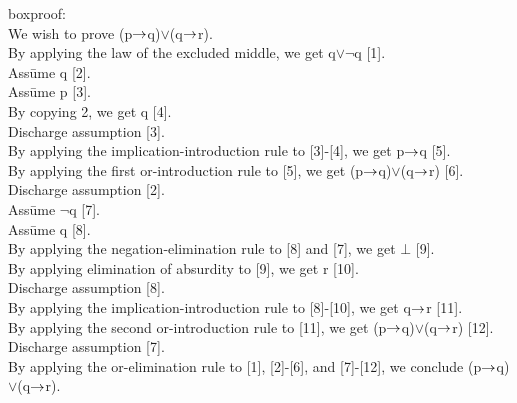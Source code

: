 \begin{tabbing}
boxproof:\\
We wish to prove (p\(\rightarrow\)q)\(\lor\)(q\(\rightarrow\)r).\\
By applying the law of the excluded middle, we get q\(\lor\)\(\neg\)q [1].\\
Ass\=ume \+ q [2].\\ 
	Ass\=ume \+ p [3].\\
		By copying 2, we get q [4].\\
	\< \- Discharge assumption [3].\\
	By applying the implication-introduction rule to [3]-[4], we get p\(\rightarrow\)q [5].\\
	By applying the first or-introduction rule to [5], we get (p\(\rightarrow\)q)\(\lor\)(q\(\rightarrow\)r) [6].\\
\< \- Discharge assumption [2].\\
Ass\=ume \+ \(\neg\)q [7].\\
	Ass\=ume \+ q [8].\\
		By applying the negation-elimination rule to [8] and [7], we get \(\bot\) [9].\\
		By applying elimination of absurdity to [9], we get r [10].\\
	\< \- Discharge assumption [8].\\
	By applying the implication-introduction rule to [8]-[10], we get q\(\rightarrow\)r [11].\\
	By applying the second or-introduction rule to [11], we get (p\(\rightarrow\)q)\(\lor\)(q\(\rightarrow\)r) [12].\\
\< \- Discharge assumption [7].\\
By applying the or-elimination rule to [1], [2]-[6], and [7]-[12], we conclude (p\(\rightarrow\)q)\(\lor\)(q\(\rightarrow\)r).
\end{tabbing}
